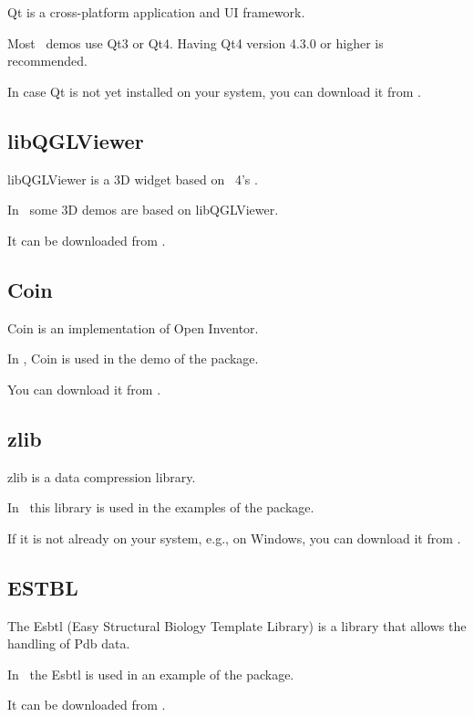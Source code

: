 Qt is a cross-platform application and UI framework.

Most \cgal\ demos use Qt3 or Qt4.
Having Qt4 version 4.3.0 or higher is recommended.

In case Qt is not yet installed on your system, you can download 
it from \qtpage. 

\subsection{libQGLViewer \label{thirdparty:libQGLViewer}}

libQGLViewer is a 3D widget based on \qt~4's .

In \cgal\ some 3D demos are based on libQGLViewer. 

It can be downloaded from \libqglviewerpage.


\subsection{Coin \label{thirdparty:Coin}}

Coin is an implementation of Open Inventor.  

In \cgal, Coin is used in the demo
of the  package. 

You can download it from \coinpage.


\subsection{zlib \label{thirdparty:zlib}}

zlib is a data compression library.

In \cgal\ this library is used in the examples of the  package.

If it is not already on your system,
e.g., on Windows, you can download it from  \zlibpage.


\subsection{ESTBL \label{thirdparty:ESTBL}}

The {\sc Esbtl} (Easy Structural Biology Template Library) is a library that allows 
the handling of {\sc Pdb} data.

In \cgal\ the  {\sc Esbtl} is used in an example of the 
 package.

It can be downloaded from \esbtlpage.


